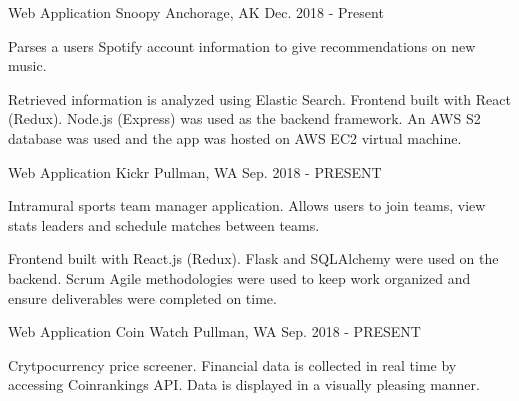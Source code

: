 \begin{cventries}
\cventry
    {Web Application}
    {Snoopy}
    {Anchorage, AK}
    {Dec. 2018 - Present}
    {
      \begin{cvitems}
        \item {Parses a users Spotify account information to give recommendations on new music.}
        \item {Retrieved information is analyzed using Elastic Search. Frontend built with React (Redux). Node.js (Express) was used as the backend framework. An AWS S2 database was used and the app was hosted on AWS EC2 virtual machine.}
      \end{cvitems}
    }
  \cventry
    {Web Application}
    {Kickr}
    {Pullman, WA}
    {Sep. 2018 - PRESENT}
    {
      \begin{cvitems}
        \item {Intramural sports team manager application. Allows users to join teams, view stats leaders and schedule matches between teams.}
        \item {Frontend built with React.js (Redux). Flask and SQLAlchemy were used on the backend. Scrum Agile methodologies were used to keep work organized and ensure deliverables were completed on time.}
      \end{cvitems}
    }
    \cventry
    {Web Application}
    {Coin Watch}
    {Pullman, WA}
    {Sep. 2018 - PRESENT}
    {
      \begin{cvitems}
        \item {Crytpocurrency price screener. Financial data is collected in real time by accessing Coinrankings API. Data is displayed in a visually pleasing manner.}
      \end{cvitems}
    }
    
\end{cventries}
